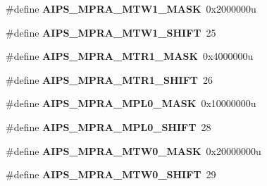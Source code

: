 \begin{DoxyCompactItemize}
\item 
\hypertarget{group___a_i_p_s___register___masks_ga54a1962c09edd7b129e2dd4b67a7b5ec}{}\#define {\bfseries A\+I\+P\+S\+\_\+\+M\+P\+R\+A\+\_\+\+M\+T\+W1\+\_\+\+M\+A\+S\+K}~0x2000000u\label{group___a_i_p_s___register___masks_ga54a1962c09edd7b129e2dd4b67a7b5ec}

\item 
\hypertarget{group___a_i_p_s___register___masks_ga8b5e668ac41d155473af3519b08e114c}{}\#define {\bfseries A\+I\+P\+S\+\_\+\+M\+P\+R\+A\+\_\+\+M\+T\+W1\+\_\+\+S\+H\+I\+F\+T}~25\label{group___a_i_p_s___register___masks_ga8b5e668ac41d155473af3519b08e114c}

\item 
\hypertarget{group___a_i_p_s___register___masks_ga89303525553285ea9f444821628d92af}{}\#define {\bfseries A\+I\+P\+S\+\_\+\+M\+P\+R\+A\+\_\+\+M\+T\+R1\+\_\+\+M\+A\+S\+K}~0x4000000u\label{group___a_i_p_s___register___masks_ga89303525553285ea9f444821628d92af}

\item 
\hypertarget{group___a_i_p_s___register___masks_gae4382b84815388eda50c7775ab6c5d21}{}\#define {\bfseries A\+I\+P\+S\+\_\+\+M\+P\+R\+A\+\_\+\+M\+T\+R1\+\_\+\+S\+H\+I\+F\+T}~26\label{group___a_i_p_s___register___masks_gae4382b84815388eda50c7775ab6c5d21}

\item 
\hypertarget{group___a_i_p_s___register___masks_ga640ea29414892ddc0f47e1180953d72c}{}\#define {\bfseries A\+I\+P\+S\+\_\+\+M\+P\+R\+A\+\_\+\+M\+P\+L0\+\_\+\+M\+A\+S\+K}~0x10000000u\label{group___a_i_p_s___register___masks_ga640ea29414892ddc0f47e1180953d72c}

\item 
\hypertarget{group___a_i_p_s___register___masks_gaea845919f2f15a046304226437e9eb60}{}\#define {\bfseries A\+I\+P\+S\+\_\+\+M\+P\+R\+A\+\_\+\+M\+P\+L0\+\_\+\+S\+H\+I\+F\+T}~28\label{group___a_i_p_s___register___masks_gaea845919f2f15a046304226437e9eb60}

\item 
\hypertarget{group___a_i_p_s___register___masks_ga0919bce3b10414e45d53ac21b329222e}{}\#define {\bfseries A\+I\+P\+S\+\_\+\+M\+P\+R\+A\+\_\+\+M\+T\+W0\+\_\+\+M\+A\+S\+K}~0x20000000u\label{group___a_i_p_s___register___masks_ga0919bce3b10414e45d53ac21b329222e}

\item 
\hypertarget{group___a_i_p_s___register___masks_ga901e75ccb4b546a07d81aa6cd484dc3e}{}\#define {\bfseries A\+I\+P\+S\+\_\+\+M\+P\+R\+A\+\_\+\+M\+T\+W0\+\_\+\+S\+H\+I\+F\+T}~29\label{group___a_i_p_s___register___masks_ga901e75ccb4b546a07d81aa6cd484dc3e}


\end{DoxyCompactItemize}
